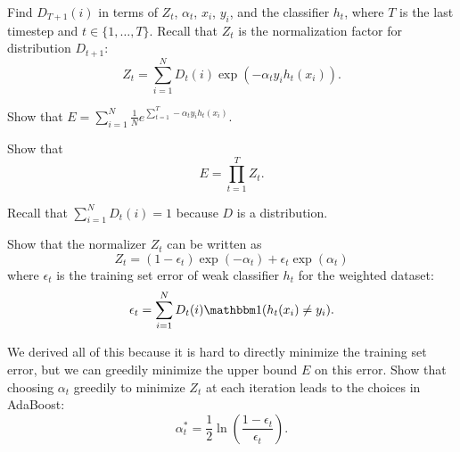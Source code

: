 \documentclass{article}
\begin{document}
\problem[3]
Find $D_{T + 1}(i)$ in terms of $Z_t$, $\alpha_t$, $x_i$, $y_i$, and the classifier $h_t$, where $T$ is the last timestep and $t \in \{1, \ldots, T\}$. Recall that $Z_t$ is the normalization factor for distribution $D_{t+1}$:
$$Z_t = \sum\limits_{i=1}^N D_t(i) \exp(-\alpha_{t}y_{i}h_{t}(x_{i})).$$

\begin{solution}

\end{solution}

\problem[2]
Show that $E = \sum_{i=1}^N  \frac{1}{N} e^{\sum_{t=1}^T -\alpha_t y_i h_t(x_i)}.$

\begin{solution}

\end{solution}

\problem[5]
Show that
$$E = \prod\limits_{t=1}^T Z_t.$$

\begin{hint}
	Recall that $\sum_{i = 1}^N D_t(i) = 1$ because $D$ is a distribution.
\end{hint}

\begin{solution}

\end{solution}

\problem[5]
Show that the normalizer $Z_t$ can be written as
\[Z_t = (1 - \epsilon_t) \exp(-\alpha_t) + \epsilon_{t} \exp(\alpha_t)\]
where $\epsilon_t$ is the training set error of weak classifier $h_t$ for the weighted dataset:
\[\epsilon_t = \sum\limits_{i=1}^N D_t(i)\mathbbm1(h_t(x_i) \neq y_i).\]

\begin{solution}
	
\end{solution}

\problem[2]
We derived all of this because it is hard to directly minimize the training set error, but we can greedily minimize the upper bound $E$ on this error. Show that choosing $\alpha_t$
greedily to minimize $Z_t$ at each iteration leads to the choices in
AdaBoost:
$$\alpha_{t}^* = \frac{1}{2} \ln \left(\frac{1 - \epsilon_t}{\epsilon_t} \right).$$

\begin{solution}
	
\end{solution}
\end{document}

